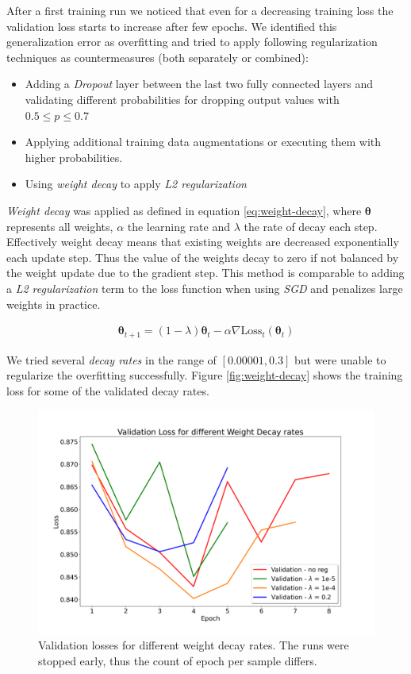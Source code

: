 After a first training run we noticed that even for a decreasing training loss the validation loss starts to increase after few epochs. We identified this generalization error as overfitting and tried to apply following regularization techniques as countermeasures (both separately or combined):
\begin{itemize}
	\item Adding a \textit{Dropout} layer between the last two fully connected layers and validating different probabilities for dropping output values with $0.5 \leq p \leq 0.7$
	\item Applying additional training data augmentations or executing them with higher probabilities.
	\item Using \textit{weight decay} to apply \textit{L2 regularization}
\end{itemize}

\textit{Weight decay} was applied as defined in equation \ref{eq:weight-decay}, where $\boldsymbol{\theta}$ represents all weights, $\alpha$ the learning rate and $\lambda$ the rate of decay each step. Effectively weight decay means that existing weights are decreased exponentially each update step. Thus the value of the weights decay to zero if not balanced by the weight update due to the gradient step. This method is comparable to adding a \textit{L2 regularization} term to the loss function when using \textit{SGD} \autocite{loshchilov2017decoupled} and penalizes large weights in practice.

\begin{align}\label{eq:weight-decay}
	\boldsymbol{\theta}_{t+1} = \left( 1 - \lambda \right) \boldsymbol{\theta}_{t} - \alpha \nabla \text{Loss}_t \left( \boldsymbol{\theta}_{t} \right)
\end{align}

We tried several \textit{decay rates} in the range of $[0.00001, 0.3]$ but were unable to regularize the overfitting successfully. Figure \vref{fig:weight-decay} shows the training loss for some of the validated decay rates.

\begin{figure}
	\centering
	\includegraphics[width=.7\linewidth]{img/reg_study_weight_decay.png}
	\caption{Validation losses for different weight decay rates. The runs were stopped early, thus the count of epoch per sample differs.}
	\label{fig:weight-decay}
\end{figure}

